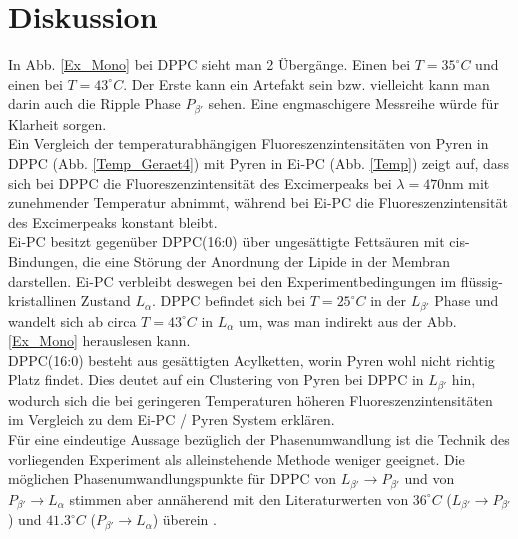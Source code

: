 \section{Diskussion}
In Abb. \ref{Ex_Mono} bei DPPC sieht man 2 Übergänge. Einen bei $T=35^\circ C$ und einen bei  $T=43^\circ C$. Der Erste kann ein Artefakt sein bzw. vielleicht kann man darin auch die Ripple Phase $P_{\beta '}$ sehen. Eine engmaschigere Messreihe würde für Klarheit sorgen.\\
Ein Vergleich der temperaturabhängigen Fluoreszenzintensitäten von Pyren in DPPC (Abb. \ref{Temp_Geraet4}) mit Pyren in Ei-PC (Abb. \ref{Temp})
zeigt auf, dass sich bei DPPC die Fluoreszenzintensität des Excimerpeaks bei $\lambda=470$nm mit zunehmender Temperatur abnimmt, während bei Ei-PC die Fluoreszenzintensität des Excimerpeaks konstant bleibt. \\
Ei-PC  besitzt gegenüber DPPC(16:0) über ungesättigte Fettsäuren mit cis-Bindungen, die eine Störung der Anordnung der Lipide in der Membran darstellen. Ei-PC verbleibt deswegen bei den Experimentbedingungen im flüssig-kristallinen Zustand $L_\alpha$. 
DPPC befindet sich bei $T=25^\circ C$ in der $L_{\beta '}$ Phase und wandelt sich ab circa $T=43^\circ C$ in $L_\alpha$ um, was man indirekt aus der Abb. \ref{Ex_Mono} herauslesen kann. \\
 DPPC(16:0) besteht aus gesättigten Acylketten, worin Pyren wohl nicht richtig Platz findet. Dies deutet auf ein Clustering von Pyren bei DPPC in $L_{\beta '}$ hin, wodurch sich die bei geringeren Temperaturen höheren Fluoreszenzintensitäten im Vergleich zu dem Ei-PC / Pyren System erklären. \\
Für eine eindeutige Aussage bezüglich der Phasenumwandlung ist die Technik  des vorliegenden Experiment als alleinstehende Methode weniger geeignet. Die möglichen Phasenumwandlungspunkte für DPPC von $L_{\beta '} \rightarrow P_{\beta '}$ und von $P_{\beta '} \rightarrow L_\alpha$ stimmen aber annäherend mit den Literaturwerten von $36^\circ C$ ($L_{\beta '} \rightarrow P_{\beta '}$) und $41.3^\circ C$ ($P_{\beta '} \rightarrow L_\alpha$) überein \cite{Biltonen1993}.\\


